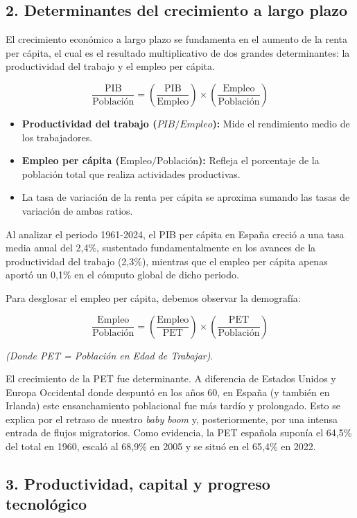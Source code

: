 \subsection*{2. Determinantes del crecimiento a largo plazo}

El crecimiento económico a largo plazo se fundamenta en el aumento de la renta per cápita, el cual es el resultado multiplicativo de dos grandes determinantes: la productividad del trabajo y el empleo per cápita.

\[
\frac{\text{PIB}}{\text{Población}} = \left(\frac{\text{PIB}}{\text{Empleo}}\right) \times \left(\frac{\text{Empleo}}{\text{Población}}\right)
\]

\begin{itemize}
  \item \textbf{Productividad del trabajo ($PIB/Empleo$):} Mide el rendimiento medio de los trabajadores.
  \item \textbf{Empleo per cápita ($\text{Empleo}/\text{Población}$):} Refleja el porcentaje de la población total que realiza actividades productivas.
  \item La tasa de variación de la renta per cápita se aproxima sumando las tasas de variación de ambas ratios.
\end{itemize}

Al analizar el periodo 1961-2024, el PIB per cápita en España creció a una tasa media anual del 2,4\%, sustentado fundamentalmente en los avances de la productividad del trabajo (2,3\%), mientras que el empleo per cápita apenas aportó un 0,1\% en el cómputo global de dicho periodo.

Para desglosar el empleo per cápita, debemos observar la demografía:

\[
\frac{\text{Empleo}}{\text{Población}} = \left(\frac{\text{Empleo}}{\text{PET}}\right) \times \left(\frac{\text{PET}}{\text{Población}}\right)
\]

\textit{(Donde PET = Población en Edad de Trabajar)}.

El crecimiento de la PET fue determinante. A diferencia de Estados Unidos y Europa Occidental donde despuntó en los años 60, en España (y también en Irlanda) este ensanchamiento poblacional fue más tardío y prolongado. Esto se explica por el retraso de nuestro \textit{baby boom} y, posteriormente, por una intensa entrada de flujos migratorios. Como evidencia, la PET española suponía el 64,5\% del total en 1960, escaló al 68,9\% en 2005 y se situó en el 65,4\% en 2022.

\subsection*{3. Productividad, capital y progreso tecnológico}

